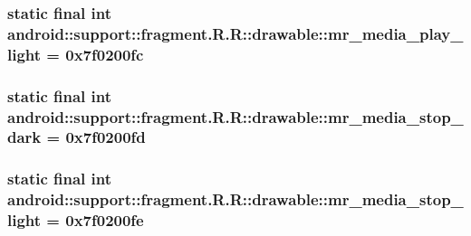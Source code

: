 \hypertarget{classandroid_1_1support_1_1fragment_1_1_r_1_1drawable_c98ddea713747acf384b5d225da2fc36}{
\subsubsection[{mr\_\-media\_\-play\_\-light}]{\setlength{\rightskip}{0pt plus 5cm}static final int android::support::fragment.R.R::drawable::mr\_\-media\_\-play\_\-light = 0x7f0200fc}}
\label{classandroid_1_1support_1_1fragment_1_1_r_1_1drawable_c98ddea713747acf384b5d225da2fc36}


\hypertarget{classandroid_1_1support_1_1fragment_1_1_r_1_1drawable_113d465eb3d8b9a0ddfb473ab91fdd5d}{
\subsubsection[{mr\_\-media\_\-stop\_\-dark}]{\setlength{\rightskip}{0pt plus 5cm}static final int android::support::fragment.R.R::drawable::mr\_\-media\_\-stop\_\-dark = 0x7f0200fd}}
\label{classandroid_1_1support_1_1fragment_1_1_r_1_1drawable_113d465eb3d8b9a0ddfb473ab91fdd5d}


\hypertarget{classandroid_1_1support_1_1fragment_1_1_r_1_1drawable_1cb64a00cbf9ba9c51baec5d90ec80a7}{
\subsubsection[{mr\_\-media\_\-stop\_\-light}]{\setlength{\rightskip}{0pt plus 5cm}static final int android::support::fragment.R.R::drawable::mr\_\-media\_\-stop\_\-light = 0x7f0200fe}}
\label{classandroid_1_1support_1_1fragment_1_1_r_1_1drawable_1cb64a00cbf9ba9c51baec5d90ec80a7}


